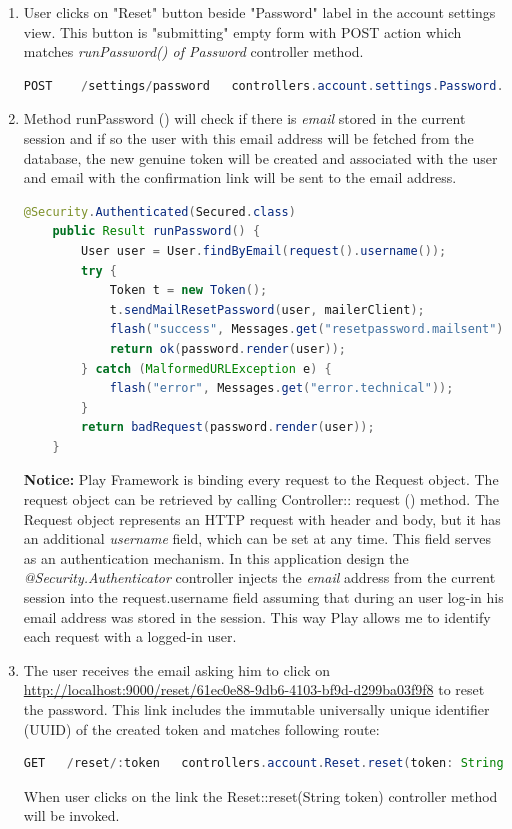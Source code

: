 \documentclass[12pt,twoside,a4paper]{report}
\begin{document}
\begin{enumerate}\itemsep1pt \parskip0pt 

\item User clicks on "Reset" button beside "Password" label in the account settings view. This button is "submitting" empty form with POST action which matches \emph{runPassword() of Password} controller method.
	\begin{lstlisting}[language=java]
	POST    /settings/password   controllers.account.settings.Password.runPassword()
	\end{lstlisting}
	
	\item Method runPassword () will check if there is \emph{email} stored in the current session and if so the user with this email address will be fetched from the database, the new genuine token will be created and associated with the user and email with the confirmation link will be sent to the email address.
\begin{lstlisting}[language=java]
	@Security.Authenticated(Secured.class)
    public Result runPassword() {
        User user = User.findByEmail(request().username());
        try {
            Token t = new Token();
            t.sendMailResetPassword(user, mailerClient);
            flash("success", Messages.get("resetpassword.mailsent"));
            return ok(password.render(user));
        } catch (MalformedURLException e) {
            flash("error", Messages.get("error.technical"));
        }
        return badRequest(password.render(user));
    }
\end{lstlisting}
\textbf{Notice:} Play Framework is binding every request to the Request object. The request object can be retrieved by calling Controller:: request () method. The Request object represents an HTTP request with header and body, but it has an additional \emph{username} field, which can be set at any time. This field serves as an authentication mechanism. In this application design the \emph{@Security.Authenticator} controller injects the \emph{email} address from the current session into the request.username field assuming that during an user log-in his email address was stored in the session. This way Play allows me to identify each request with a logged-in user.

\item The user receives the email asking him to click on \url{ http://localhost:9000/reset/61ec0e88-9db6-4103-bf9d-d299ba03f9f8} to reset the password. This link includes the immutable universally unique identifier (UUID) of the created token and matches following route:
\begin{lstlisting}[language=java]
 GET   /reset/:token   controllers.account.Reset.reset(token: String)
\end{lstlisting}
When user clicks on the link the Reset::reset(String token) controller method will be invoked.


\end{enumerate}
\end{document}

